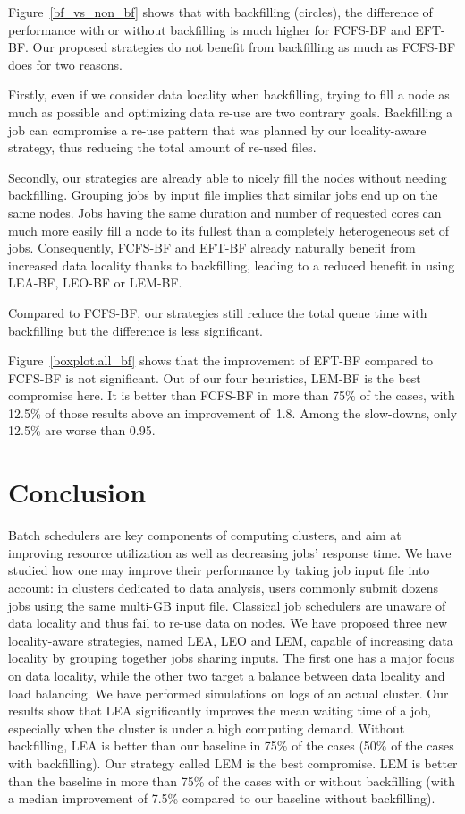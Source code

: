 \documentclass[conference]{IEEEtran}
\begin{document}
Figure~\ref{bf_vs_non_bf} shows that
with backfilling (circles),
the difference of performance with or without backfilling is much higher for FCFS-BF and EFT-BF. 
Our proposed strategies do not benefit from backfilling as much as FCFS-BF does for two reasons.

Firstly, even if we consider data locality when backfilling, trying to fill a node as much as possible and optimizing data re-use are two contrary goals. 
Backfilling a job can compromise a re-use pattern that was planned by our locality-aware strategy,
thus reducing the total amount of re-used files.

Secondly, our strategies are already able to nicely fill the nodes without needing backfilling.
Grouping jobs by input file implies that similar jobs end up on the same nodes.
Jobs having the same duration and number of requested cores can much more easily fill a node to its fullest than a completely heterogeneous set of jobs.
Consequently, FCFS-BF and EFT-BF already naturally benefit from increased data locality thanks to backfilling, leading to a reduced benefit in using LEA-BF, LEO-BF or LEM-BF.

Compared to FCFS-BF, our strategies still reduce the total queue time with backfilling but the difference is less significant.

Figure~\ref{boxplot.all_bf} shows that the improvement of EFT-BF compared to FCFS-BF is not significant.
Out of our four heuristics, LEM-BF is the best compromise here.
It is better than FCFS-BF in more than 75\% of the cases, 
with 12.5\% of those results above an improvement of~1.8.
Among the slow-downs, only 12.5\% are worse than 0.95.

\section{Conclusion}\label{sec.conclusion}

Batch schedulers are key components of computing clusters, and aim at
improving resource utilization as well as decreasing jobs' response
time. We have studied how one may improve their performance by taking
job input file into account: in clusters dedicated to data analysis,
users commonly submit dozens jobs using the same multi-GB input
file. Classical job schedulers are unaware of data locality and thus
fail to re-use data on nodes. We have proposed three new locality-aware
strategies, named LEA, LEO and LEM,
capable of increasing data locality by grouping together 
jobs sharing inputs. The first one has a major focus on data locality,
while the other two target a balance between data locality and load
balancing. We have performed simulations on logs of an actual
cluster. Our results show that LEA significantly improves the mean
waiting time of a job, especially  
when the cluster is under a high computing demand.
Without backfilling, LEA is better than our baseline in 75\% of the
cases (50\% of the cases with backfilling).
Our strategy called LEM is the best compromise. LEM is better than the baseline in more than 75\% of the cases with or without backfilling
(with a median improvement of 7.5\% compared to our baseline without backfilling).
\end{document}
